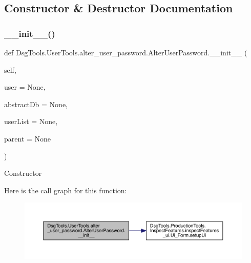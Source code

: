 \subsection{Constructor \& Destructor Documentation}
\mbox{\label{class_dsg_tools_1_1_user_tools_1_1alter__user__password_1_1_alter_user_password_a22dee59df01decc76779e9ec8df1f384}} 
\subsubsection{\texorpdfstring{\+\_\+\+\_\+init\+\_\+\+\_\+()}{\_\_init\_\_()}}
{\footnotesize\ttfamily def Dsg\+Tools.\+User\+Tools.\+alter\+\_\+user\+\_\+password.\+Alter\+User\+Password.\+\_\+\+\_\+init\+\_\+\+\_\+ (\begin{DoxyParamCaption}\item[{}]{self,  }\item[{}]{user = {\ttfamily None},  }\item[{}]{abstract\+Db = {\ttfamily None},  }\item[{}]{user\+List = {\ttfamily None},  }\item[{}]{parent = {\ttfamily None} }\end{DoxyParamCaption})}

\begin{DoxyVerb}Constructor
\end{DoxyVerb}
 Here is the call graph for this function\+:
\nopagebreak
\begin{figure}[H]
\begin{center}
\leavevmode
\includegraphics[width=350pt]{class_dsg_tools_1_1_user_tools_1_1alter__user__password_1_1_alter_user_password_a22dee59df01decc76779e9ec8df1f384_cgraph}
\end{center}
\end{figure}


